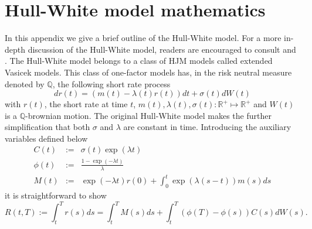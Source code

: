 \chapter{Hull-White model mathematics} \label{appendix:hw}

In this appendix we give a brief outline of the Hull-White model. For
a more in-depth discussion of the Hull-White model, readers are
encouraged to consult \cite{book:JCHULL} and \cite{book:REBONATO}. The
Hull-White model belongs to a class of HJM models called extended
Vasicek models. This class of one-factor models has, in the risk
neutral measure denoted by $\mathbb Q$, the following short rate
process
\begin{equation}
dr(t) = \left(m(t)-\lambda(t)r(t)\right) dt+\sigma(t) d W(t)
\end{equation}
with $r(t)$, the short rate at time $t$, $m(t),\lambda(t),\sigma(t):
\mathbb R^+ \mapsto \mathbb R^+$ and $W(t)$ is a $\mathbb Q$-brownian
motion. The original Hull-White model makes the further simplification
that both $\sigma$ and $\lambda$ are constant in time. Introducing the
auxiliary variables defined below
\begin{eqnarray}
C(t) &:=& \sigma(t) \exp(\lambda t) \\
\phi(t) &:=& \frac{1-\exp(-\lambda t)}{\lambda} \\
M(t) &:=& \exp(-\lambda t) r(0) + \int_0^t \exp(\lambda(s-t)) m(s) ds
\end{eqnarray}
it is straightforward to show
\begin{equation}
R(t,T) := \int_t^T r(s)ds = \int_t^T  M(s) ds + \int_t^T \left(\phi(T)-\phi(s)\right) C(s) dW(s).
\end{equation}

